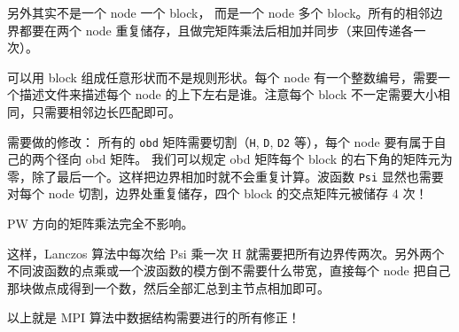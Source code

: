 
另外其实不是一个 node 一个 block， 而是一个 node 多个 block。所有的相邻边界都要在两个 node 重复储存，且做完矩阵乘法后相加并同步（来回传递各一次）。

可以用 block 组成任意形状而不是规则形状。每个 node 有一个整数编号，需要一个描述文件来描述每个 node 的上下左右是谁。注意每个 block 不一定需要大小相同，只需要相邻边长匹配即可。

需要做的修改： 所有的 \verb`obd` 矩阵需要切割（\verb`H`, \verb`D`, \verb`D2` 等），每个 node 要有属于自己的两个径向 obd 矩阵。 我们可以规定 obd 矩阵每个 block 的右下角的矩阵元为零，除了最后一个。这样把边界相加时就不会重复计算。波函数 \verb`Psi` 显然也需要对每个 node 切割，边界处重复储存，四个 block 的交点矩阵元被储存 4 次！

PW 方向的矩阵乘法完全不影响。

这样，Lanczos 算法中每次给 Psi 乘一次 H 就需要把所有边界传两次。另外两个不同波函数的点乘或一个波函数的模方倒不需要什么带宽，直接每个 node 把自己那块做点成得到一个数，然后全部汇总到主节点相加即可。

以上就是 MPI 算法中数据结构需要进行的所有修正！
